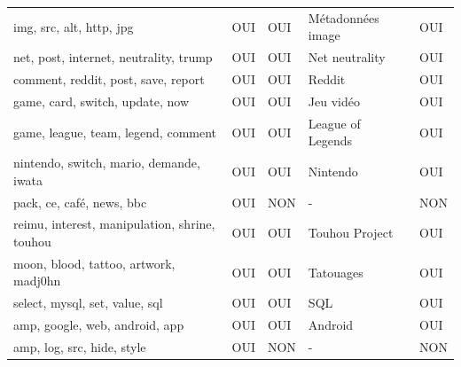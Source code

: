 \begin{longtable}{lllll}
\scriptsize img, src, alt, http, jpg                           & \cellcolor[HTML]{9AFF99}OUI & \cellcolor[HTML]{9AFF99}OUI & Métadonnées image         & \cellcolor[HTML]{9AFF99}OUI \\
\scriptsize net, post, internet, neutrality, trump             & \cellcolor[HTML]{9AFF99}OUI & \cellcolor[HTML]{9AFF99}OUI & Net neutrality            & \cellcolor[HTML]{9AFF99}OUI \\
\scriptsize comment, reddit, post, save, report                & \cellcolor[HTML]{9AFF99}OUI & \cellcolor[HTML]{9AFF99}OUI & Reddit                    & \cellcolor[HTML]{9AFF99}OUI \\
\scriptsize game, card, switch, update, now                    & \cellcolor[HTML]{9AFF99}OUI & \cellcolor[HTML]{9AFF99}OUI & Jeu vidéo                 & \cellcolor[HTML]{9AFF99}OUI \\
\scriptsize game, league, team, legend, comment                & \cellcolor[HTML]{9AFF99}OUI & \cellcolor[HTML]{9AFF99}OUI & League of Legends         & \cellcolor[HTML]{9AFF99}OUI \\
\scriptsize nintendo, switch, mario, demande, iwata            & \cellcolor[HTML]{9AFF99}OUI & \cellcolor[HTML]{9AFF99}OUI & Nintendo                  & \cellcolor[HTML]{9AFF99}OUI \\
\scriptsize pack, ce, café, news, bbc                          & \cellcolor[HTML]{9AFF99}OUI & \cellcolor[HTML]{FFCCC9}NON & -                         & \cellcolor[HTML]{FFCCC9}NON \\
\scriptsize reimu, interest, manipulation, shrine, touhou      & \cellcolor[HTML]{9AFF99}OUI & \cellcolor[HTML]{9AFF99}OUI & Touhou Project            & \cellcolor[HTML]{9AFF99}OUI \\
\scriptsize moon, blood, tattoo, artwork, madj0hn              & \cellcolor[HTML]{9AFF99}OUI & \cellcolor[HTML]{9AFF99}OUI & Tatouages                 & \cellcolor[HTML]{9AFF99}OUI \\
\scriptsize select, mysql, set, value, sql                     & \cellcolor[HTML]{9AFF99}OUI & \cellcolor[HTML]{9AFF99}OUI & SQL                       & \cellcolor[HTML]{9AFF99}OUI \\
\scriptsize amp, google, web, android, app                     & \cellcolor[HTML]{9AFF99}OUI & \cellcolor[HTML]{9AFF99}OUI & Android                   & \cellcolor[HTML]{9AFF99}OUI \\
\scriptsize amp, log, src, hide, style                         & \cellcolor[HTML]{9AFF99}OUI & \cellcolor[HTML]{FFCCC9}NON & -                         & \cellcolor[HTML]{FFCCC9}NON \\

\end{longtable}
